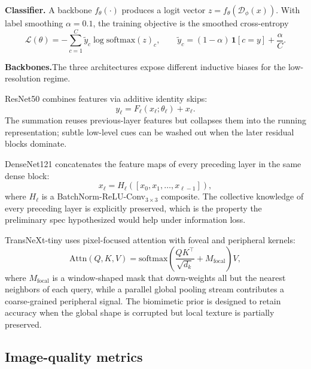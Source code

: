 \textbf{Classifier.}\quad
A backbone $f_{\theta}(\cdot)$ produces a logit vector
$z = f_{\theta}(\mathcal{D}_{\phi}(x))$. With label smoothing $\alpha = 0.1$,
the training objective is the smoothed cross-entropy
\begin{equation}
  \mathcal{L}(\theta) = -\sum_{c=1}^{C} \tilde y_c \log \mathrm{softmax}(z)_c,
  \qquad
  \tilde y_c = (1 - \alpha)\, \mathbf{1}[c = y] + \frac{\alpha}{C}.
  \label{eq:loss}
\end{equation}

\textbf{Backbones.}\quad The three architectures expose different inductive
biases for the low-resolution regime.

ResNet50 \cite{he2016resnet} combines features via additive identity skips:
\begin{equation}
  y_\ell = F_\ell(x_\ell; \theta_\ell) + x_\ell.
  \label{eq:resnet}
\end{equation}
The summation reuses previous-layer features but collapses them into the
running representation; subtle low-level cues can be washed out when the
later residual blocks dominate.

DenseNet121 \cite{huang2017densenet} concatenates the feature maps of every
preceding layer in the same dense block:
\begin{equation}
  x_\ell = H_\ell([x_0, x_1, \ldots, x_{\ell-1}]),
  \label{eq:densenet}
\end{equation}
where $H_\ell$ is a BatchNorm-ReLU-Conv$_{3 \times 3}$ composite. The
collective knowledge of every preceding layer is explicitly preserved, which
is the property the preliminary spec hypothesized would help under
information loss.

TransNeXt-tiny \cite{shi2024transnext} uses pixel-focused attention with
foveal and peripheral kernels:
\begin{equation}
  \mathrm{Attn}(Q, K, V) = \mathrm{softmax}\!\left(\frac{Q K^{\top}}{\sqrt{d_k}} + M_{\text{focal}}\right) V,
  \label{eq:transnext}
\end{equation}
where $M_{\text{focal}}$ is a window-shaped mask that down-weights all but
the nearest neighbors of each query, while a parallel global pooling stream
contributes a coarse-grained peripheral signal. The biomimetic prior is
designed to retain accuracy when the global shape is corrupted but local
texture is partially preserved.

\subsection{Image-quality metrics}
\label{sec:design:psnr}

